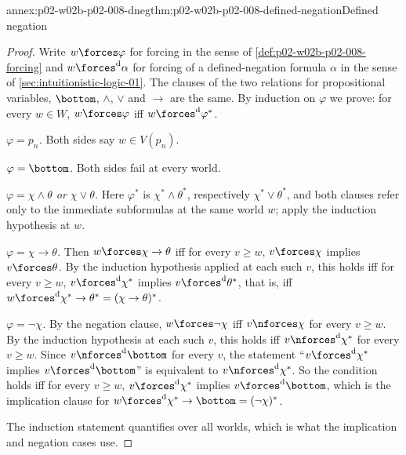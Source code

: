 \begin{annexitem}{annex:p02-w02b-p02-008-dneg}{thm:p02-w02b-p02-008-defined-negation}{Defined negation}
\begin{proof}
Write \(w\forces\varphi\) for forcing in the sense of
\cref{def:p02-w02b-p02-008-forcing} and \(w\forces^{\mathrm d}\alpha\) for
forcing of a defined-negation formula \(\alpha\) in the sense of
\cref{sec:intuitionistic-logic-01}.  The clauses of the two relations for
propositional variables, \(\bottom\), \(\land\), \(\lor\) and \(\to\) are the
same.  By induction on \(\varphi\) we prove: for every \(w\in W\),
\(w\forces\varphi\) iff \(w\forces^{\mathrm d}\varphi^{\ast}\).

\emph{\(\varphi=p_n\).}  Both sides say \(w\in V(p_n)\).

\emph{\(\varphi=\bottom\).}  Both sides fail at every world.

\emph{\(\varphi=\chi\land\theta\) or \(\chi\lor\theta\).}  Here
\(\varphi^{\ast}\) is \(\chi^{\ast}\land\theta^{\ast}\), respectively
\(\chi^{\ast}\lor\theta^{\ast}\), and both clauses refer only to the
immediate subformulas at the same world \(w\); apply the induction hypothesis
at \(w\).

\emph{\(\varphi=\chi\to\theta\).}  Then
\(w\forces\chi\to\theta\) iff for every \(v\geq w\), \(v\forces\chi\) implies
\(v\forces\theta\).  By the induction hypothesis applied at each such \(v\),
this holds iff for every \(v\geq w\), \(v\forces^{\mathrm d}\chi^{\ast}\)
implies \(v\forces^{\mathrm d}\theta^{\ast}\), that is, iff
\(w\forces^{\mathrm d}\chi^{\ast}\to\theta^{\ast}=(\chi\to\theta)^{\ast}\).

\emph{\(\varphi=\neg\chi\).}  By the negation clause,
\(w\forces\neg\chi\) iff \(v\nforces\chi\) for every \(v\geq w\).  By the
induction hypothesis at each such \(v\), this holds iff
\(v\nforces^{\mathrm d}\chi^{\ast}\) for every \(v\geq w\).  Since
\(v\nforces^{\mathrm d}\bottom\) for every \(v\), the statement
``\(v\forces^{\mathrm d}\chi^{\ast}\) implies \(v\forces^{\mathrm d}\bottom\)''
is equivalent to \(v\nforces^{\mathrm d}\chi^{\ast}\).  So the condition holds
iff for every \(v\geq w\), \(v\forces^{\mathrm d}\chi^{\ast}\) implies
\(v\forces^{\mathrm d}\bottom\), which is the implication clause for
\(w\forces^{\mathrm d}\chi^{\ast}\to\bottom=(\neg\chi)^{\ast}\).

The induction statement quantifies over all worlds, which is what the
implication and negation cases use.
\end{proof}
\end{annexitem}

